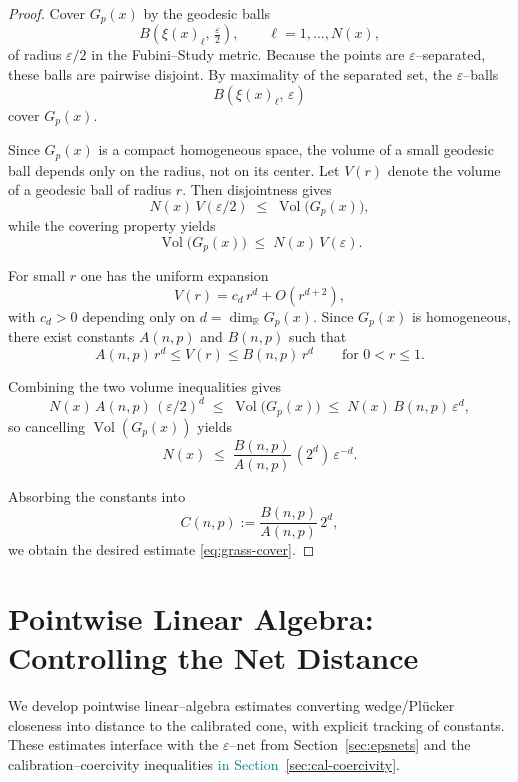 \documentclass[11pt]{article}
\newcommand{\REVMZ}[1]{\textcolor{teal}{#1}}  %
\numberwithin{equation}{section}  %
\theoremstyle{plain}
\theoremstyle{definition}
\theoremstyle{remark}
\newcommand{\R}{\mathbb{R}}
\DeclareMathOperator{\Vol}{Vol}
\begin{document}
\begin{proof}
	Cover $G_{p}(x)$ by the geodesic balls
	\[
	B\!\left(\xi(x)_\ell,\,\tfrac{\varepsilon}{2}\right),
	\qquad \ell=1,\dots,N(x),
	\]
	of radius $\varepsilon/2$ in the Fubini--Study metric.  
	Because the points are $\varepsilon$--separated, these balls are pairwise
	disjoint.  By maximality of the separated set, the $\varepsilon$--balls
	\[
	B\!\left(\xi(x)_\ell,\,\varepsilon\right)
	\]
	cover $G_{p}(x)$.
	
	Since $G_{p}(x)$ is a compact homogeneous space, the volume of a small
	geodesic ball depends only on the radius, not on its center.  
	Let $V(r)$ denote the volume of a geodesic ball of radius $r$.  
	Then disjointness gives
	\[
	N(x)\,V(\varepsilon/2)
	\;\le\; \Vol\bigl(G_{p}(x)\bigr),
	\]
	while the covering property yields
	\[
	\Vol\bigl(G_{p}(x)\bigr)
	\;\le\; N(x)\,V(\varepsilon).
	\]
	
	For small $r$ one has the uniform expansion
	\[
	V(r) = c_{d}\,r^{d} + O(r^{d+2}),
	\]
	with $c_{d}>0$ depending only on $d = \dim_{\R} G_{p}(x)$.  
	Since $G_{p}(x)$ is homogeneous, there exist constants $A(n,p)$ and $B(n,p)$
	such that
	\[
	A(n,p)\,r^{d} \le V(r) \le B(n,p)\,r^{d}
	\qquad\text{for } 0<r\le 1.
	\]
	
	Combining the two volume inequalities gives
	\[
	N(x)\,A(n,p)\,(\varepsilon/2)^{d}
	\;\le\; \Vol\bigl(G_{p}(x)\bigr)
	\;\le\; N(x)\,B(n,p)\,\varepsilon^{d},
	\]
	so cancelling $\Vol(G_{p}(x))$ yields
	\[
	N(x) \;\le\;
	\frac{B(n,p)}{A(n,p)}\,(2^{d})\,
	\varepsilon^{-d}.
	\]
	
	Absorbing the constants into
	\[
	C(n,p) := \frac{B(n,p)}{A(n,p)}\,2^{d},
	\]
	we obtain the desired estimate \eqref{eq:grass-cover}.
\end{proof}

\section{Pointwise Linear Algebra: Controlling the Net Distance}
\label{sec:linear-algebra}






We develop pointwise linear--algebra estimates converting wedge/Pl\"ucker closeness into distance to the calibrated cone, with explicit tracking of constants. These estimates interface with the $\varepsilon$--net from Section~\ref{sec:epsnets} and the calibration--coercivity inequalities \REVMZ{in Section~\ref{sec:cal-coercivity}}.
\end{document}
